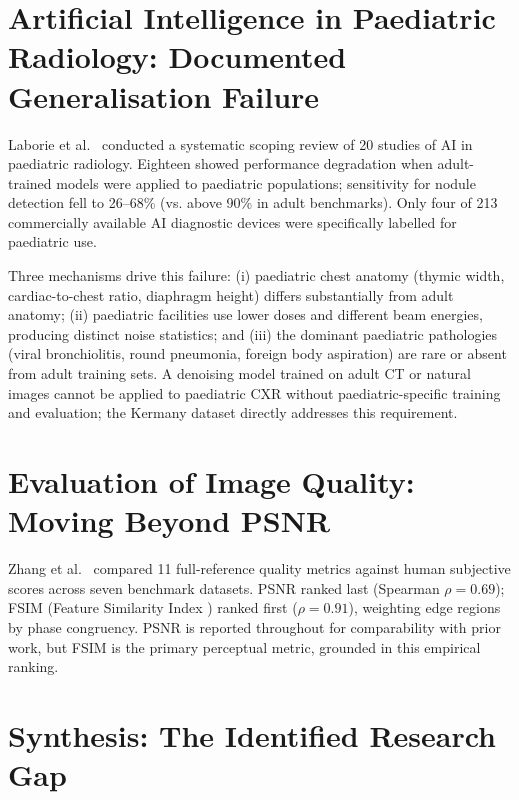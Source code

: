 \documentclass[12pt, a4paper, twoside, openright]{book}
\begin{document}
\section{Artificial Intelligence in Paediatric Radiology: Documented Generalisation Failure}
\label{sec:lit:paediatric}

Laborie et al.\ \cite{laborie_scoping_2026} conducted a systematic scoping review of 20 studies of AI in paediatric radiology. Eighteen showed performance degradation when adult-trained models were applied to paediatric populations; sensitivity for nodule detection fell to 26--68\% (vs. above 90\% in adult benchmarks). Only four of 213 commercially available AI diagnostic devices were specifically labelled for paediatric use.

Three mechanisms drive this failure: (i) paediatric chest anatomy (thymic width, cardiac-to-chest ratio, diaphragm height) differs substantially from adult anatomy; (ii) paediatric facilities use lower doses and different beam energies, producing distinct noise statistics; and (iii) the dominant paediatric pathologies (viral bronchiolitis, round pneumonia, foreign body aspiration) are rare or absent from adult training sets. A denoising model trained on adult CT or natural images cannot be applied to paediatric CXR without paediatric-specific training and evaluation; the Kermany dataset directly addresses this requirement.

\section{Evaluation of Image Quality: Moving Beyond PSNR}
\label{sec:lit:iqametrics}

Zhang et al.\ \cite{zhang_comprehensive_2012} compared 11 full-reference quality metrics against human subjective scores across seven benchmark datasets. PSNR ranked last (Spearman $\rho = 0.69$); FSIM (Feature Similarity Index \cite{zhang_fsim_2011}) ranked first ($\rho = 0.91$), weighting edge regions by phase congruency. PSNR is reported throughout for comparability with prior work, but FSIM is the primary perceptual metric, grounded in this empirical ranking.

\section{Synthesis: The Identified Research Gap}
\label{sec:lit:gap}
\end{document}
